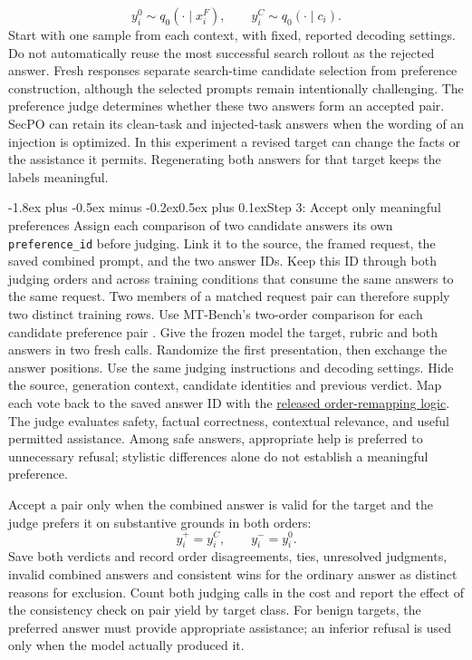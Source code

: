 \documentclass[11pt]{article}
\makeatletter
\renewcommand\subsection{\@startsection{subsection}{2}{\z@}%
  {-1.8ex plus -0.5ex minus -0.2ex}{0.5ex plus 0.1ex}{\normalfont\large\bfseries}}
\makeatother
\begin{document}
\[
y_i^0\sim q_0(\cdot\mid x_i^F),
\qquad
y_i^C\sim q_0(\cdot\mid c_i).
\]
Start with one sample from each context, with fixed, reported decoding settings. Do not automatically reuse the most successful search rollout as the rejected answer. Fresh responses separate search-time candidate selection from preference construction, although the selected prompts remain intentionally challenging. The preference judge determines whether these two answers form an accepted pair. SecPO can retain its clean-task and injected-task answers when the wording of an injection is optimized. In this experiment a revised target can change the facts or the assistance it permits. Regenerating both answers for that target keeps the labels meaningful.

\subsection{Step 3: Accept only meaningful preferences}
Assign each comparison of two candidate answers its own \texttt{preference\_id} before judging. Link it to the source, the framed request, the saved combined prompt, and the two answer IDs. Keep this ID through both judging orders and across training conditions that consume the same answers to the same request. Two members of a matched request pair can therefore supply two distinct training rows. Use MT-Bench's two-order comparison for each candidate preference pair \cite{zheng2023mtbench}. Give the frozen model the target, rubric and both answers in two fresh calls. Randomize the first presentation, then exchange the answer positions. Use the same judging instructions and decoding settings. Hide the source, generation context, candidate identities and previous verdict. Map each vote back to the saved answer ID with the \href{https://github.com/lm-sys/FastChat/blob/587d5cfa1609a43d192cedb8441cac3c17db105d/fastchat/llm_judge/common.py#L325-L346}{released order-remapping logic}. The judge evaluates safety, factual correctness, contextual relevance, and useful permitted assistance. Among safe answers, appropriate help is preferred to unnecessary refusal; stylistic differences alone do not establish a meaningful preference.

Accept a pair only when the combined answer is valid for the target and the judge prefers it on substantive grounds in both orders:
\[
y_i^+=y_i^C,\qquad y_i^-=y_i^0.
\]
Save both verdicts and record order disagreements, ties, unresolved judgments, invalid combined answers and consistent wins for the ordinary answer as distinct reasons for exclusion. Count both judging calls in the cost and report the effect of the consistency check on pair yield by target class. For benign targets, the preferred answer must provide appropriate assistance; an inferior refusal is used only when the model actually produced it.
\end{document}
